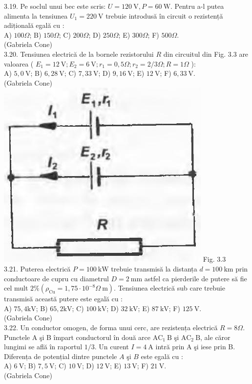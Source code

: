 3.19. Pe soclul unui bec este scris: $U=120 \mathrm{~V}, P=60 \mathrm{~W}$. Pentru a-l putea alimenta la tensiunea $U_{1}=220 \mathrm{~V}$ trebuie introdusă în circuit o rezistență adițională egală cu :\\ A) $100 \Omega$; B) $150 \Omega$; C) $200 \Omega$; D) $250 \Omega$; E) $300 \Omega$; F) $500 \Omega$.\\ (Gabriela Cone)\\

3.20. Tensiunea electrică de la bornele rezistorului $R$ din circuitul din Fig. 3.3 are valoarea ( $E_{1}=12 \mathrm{~V} ; E_{2}=6 \mathrm{~V} ; r_{1}=0,5 \Omega ; r_{2}=2 / 3 \Omega ; R=1 \Omega$ ):\\ A) $5,0 \mathrm{~V}$; B) $6,28 \mathrm{~V}$; C) $7,33 \mathrm{~V}$; D) $9,16 \mathrm{~V}$; E) $12 \mathrm{~V}$; F) $6,33 \mathrm{~V}$.\\ (Gabriela Cone)\\ \includegraphics[width=0.4\linewidth]{images/2025_07_01_5b3ff9fa0d508c8e9f17g-147} Fig. 3.3\\

3.21. Puterea electrică $P=100 \mathrm{~kW}$ trebuie transmisă la distanța $d=100 \mathrm{~km}$ prin conductoare de cupru cu diametrul $D=2 \mathrm{~mm}$ astfel ca pierderile de putere să fie cel mult $2 \%\left(\rho_{\mathrm{Cu}}=1,75 \cdot 10^{-8} \Omega \mathrm{~m}\right)$. Tensiunea electrică sub care trebuie transmisă această putere este egală cu :\\ A) $75,4 \mathrm{kV}$; B) $65,2 \mathrm{kV}$; C) $100 \mathrm{~kV}$; D) $32 \mathrm{~kV}$; E) $87 \mathrm{~kV}$; F) $125 \mathrm{~V}$.\\ (Gabriela Cone)\\

3.22. Un conductor omogen, de forma unui cerc, are rezistența electrică $R=8 \Omega$. Punctele A şi B împart conductorul în două arce $\mathrm{AC}_{1} \mathrm{~B}$ şi $\mathrm{AC}_{2} \mathrm{~B}$, ale căror lungimi se află în raportul $1 / 3$. Un curent $I=4 \mathrm{~A}$ intră prin A şi iese prin B. Diferența de potențial dintre punctele $A$ şi $B$ este egală cu :\\ A) $6 \mathrm{~V}$; B) $7,5 \mathrm{~V}$; C) $10 \mathrm{~V}$; D) $12 \mathrm{~V}$; E) $13 \mathrm{~V}$; F) $21 \mathrm{~V}$.\\ (Gabriela Cone)\\

